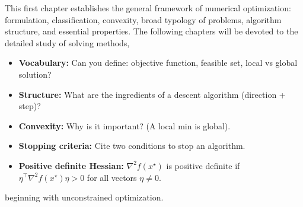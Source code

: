 \medskip

This first chapter establishes the general framework of numerical optimization: formulation, classification,
convexity, broad typology of problems, algorithm structure, and essential properties.
The following chapters will be devoted to the detailed study of solving methods,
\bigskip
\begin{checkpoint}
\begin{itemize}
    \item \textbf{Vocabulary:} Can you define: objective function, feasible set, local vs global solution?
    \item \textbf{Structure:} What are the ingredients of a descent algorithm (direction + step)?
    \item \textbf{Convexity:} Why is it important? (A local min is global).
    \item \textbf{Stopping criteria:} Cite two conditions to stop an algorithm.
    \item \textbf{Positive definite Hessian:} $\nabla^2 f(x^\star)$ is positive definite if $\eta^\top \nabla^2 f(x^\star) \eta > 0$ for all vectors $\eta \neq 0$.
\end{itemize}
\end{checkpoint}
beginning with unconstrained optimization.
